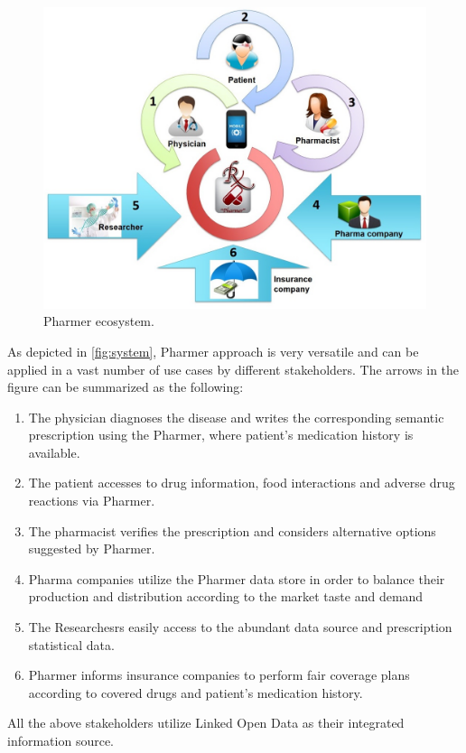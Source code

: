 \documentclass[journal]{IEEEtran}
\begin{document}
\begin{figure}[tb]
	\centering
		\includegraphics[width=1.5\columnwidth]{images/stake.jpg}
	\caption{Pharmer ecosystem.}
	\label{fig:system}
\end{figure}

As depicted in \autoref{fig:system}, Pharmer approach is very versatile and can be applied in a vast number of use cases by different stakeholders.
The arrows in the figure can be summarized as the following:
\begin{enumerate}
\item The physician diagnoses the disease and writes the corresponding semantic prescription using the Pharmer, where patient's medication history is available.
\item The patient accesses to drug information, food interactions and adverse drug reactions via Pharmer.
\item The pharmacist verifies the prescription and considers alternative options suggested by Pharmer.
\item Pharma companies utilize the Pharmer data store in order to balance their production and distribution according to the market taste and demand
\item The Researchesrs easily access to the abundant data source and prescription statistical data.
\item Pharmer informs insurance companies to perform fair coverage plans according to covered drugs and patient's medication history.
\end{enumerate}
All the above stakeholders utilize Linked Open Data as their integrated information source.
\end{document}
